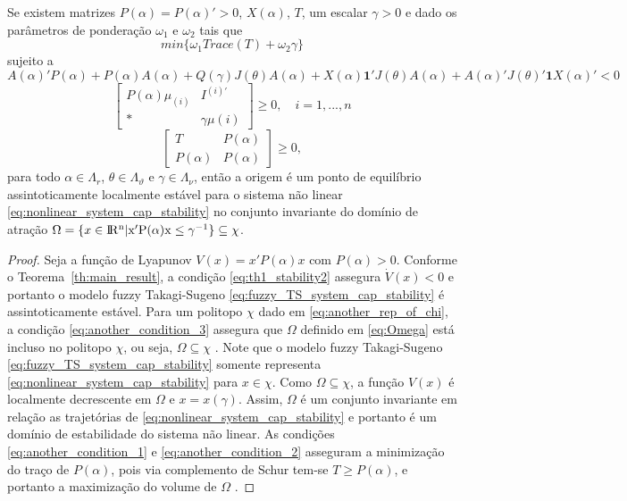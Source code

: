 	\begin{theorem} \label{th:reg_atrac_1}
		Se existem matrizes $P(\alpha) = P(\alpha)' > 0$, $X(\alpha)$, 
		$T$, um  escalar $\gamma >0$ e dado os parâmetros de ponderação $\omega_1$ e $\omega_2$ tais que
		\begin{equation}\label{eq:another_condition_1}
		min\{\omega_1Trace(T) +\omega_2\gamma\}
		\end{equation}
		sujeito a
		\begin{equation}\label{eq:th1_stability2}
		A(\alpha)'P(\alpha) + P(\alpha)A(\alpha) + Q(\gamma)J(\theta)A(\alpha) + X(\alpha)\textbf{1}'J(\theta)A(\alpha) + A(\alpha)'J(\theta)'\textbf{1}X(\alpha)' < 0
		\end{equation}
		\begin{equation}\label{eq:another_condition_3}
		\begin{bmatrix}P(\alpha)\mu_{(i)}&I^{(i)'}\\\textbf{*}&\gamma\mu{(i)}\end{bmatrix} \geq 0,\quad i = 1, ..., n
		\end{equation} 
		\begin{equation}\label{eq:another_condition_2}
		\begin{bmatrix}T&P(\alpha)\\P(\alpha)&P(\alpha)\end{bmatrix} \geq 0,
		\end{equation}	
		para todo $\alpha \in \Lambda_r$, $\theta \in \Lambda_{\vartheta}$ e $\gamma \in\Lambda_{\nu}$, 
		então 
		a origem é um ponto de equilíbrio assintoticamente localmente estável
		para o sistema não linear \ref{eq:nonlinear_system_cap_stability}
		no conjunto invariante do domínio de atração
		$\Omega = \{x\in\rm I\!R^{n}| x'P(\alpha)x \leq \gamma^{-1}\}\subseteq \chi$.
	\end{theorem}
	\begin{proof}
		Seja a função de Lyapunov $V(x)=x'P(\alpha)x$ com $P(\alpha)>0$.
		Conforme o Teorema~\ref{th:main_result}, a condição
		\ref{eq:th1_stability2} assegura $\dot{V}(x)<0$ e 
		portanto o modelo fuzzy Takagi-Sugeno \ref{eq:fuzzy_TS_system_cap_stability} é assintoticamente
		estável.
		Para um politopo $\chi$ dado em \ref{eq:another_rep_of_chi},
		a condição \ref{eq:another_condition_3} assegura que
		$\Omega$ definido em \ref{eq:Omega} está incluso no politopo $\chi$,
		ou seja, $\Omega \subseteq \chi$ \cite{bookboydl:1994}.
		Note que o modelo fuzzy Takagi-Sugeno \ref{eq:fuzzy_TS_system_cap_stability} somente representa 
		\ref{eq:nonlinear_system_cap_stability} para $x\in \chi$.
		Como $\Omega \subseteq \chi$, a função $V(x)$
		é localmente decrescente em $\Omega$ e $x=x(\gamma)$. Assim,
		$\Omega$ é um conjunto invariante em relação
		as trajetórias de \ref{eq:nonlinear_system_cap_stability}
		e portanto é um domínio de estabilidade do sistema não linear.
		As condições \ref{eq:another_condition_1} e \ref{eq:another_condition_2} asseguram a minimização do traço de $P(\alpha)$, 
		pois via complemento de Schur tem-se $T\geq P(\alpha)$, e portanto
		a maximização do volume de $\Omega$ \cite{bookboydl:1994}.
	\end{proof}

